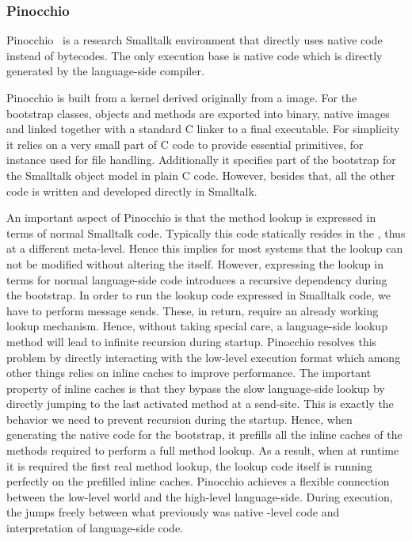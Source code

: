 \subsubsection*{Pinocchio \VM}

Pinocchio~\cite{Verw11a} is a research Smalltalk environment that directly uses native code instead of bytecodes.
The only execution base is native code which is directly generated by the language-side compiler.

Pinocchio is built from a kernel derived originally from a \PH image.
For the bootstrap classes, objects and methods are exported into binary, native images and linked together with a standard C linker to a final executable.
For simplicity it relies on a very small part of C code to provide essential primitives, for instance used for file handling.
Additionally it specifies part of the bootstrap for the Smalltalk object model in plain C code.
However, besides that, all the other code is written and developed directly in Smalltalk.

An important aspect of Pinocchio is that the method lookup is expressed in terms of normal Smalltalk code.
Typically this code statically resides in the \VM, thus at a different meta-level.
Hence this implies for most systems that the lookup can not be modified without altering the \VM itself.
However, expressing the lookup in terms for normal language-side code introduces a recursive dependency during the bootstrap.
In order to run the lookup code expressed in Smalltalk code, we have to perform message sends.
These, in return, require an already working lookup mechanism.
Hence, without taking special care, a language-side lookup method will lead to infinite recursion during startup.
Pinocchio resolves this problem by directly interacting with the low-level execution format which among other things relies on inline caches to improve performance.
The important property of inline caches is that they bypass the slow language-side lookup by directly jumping to the last activated method at a send-site.
This is exactly the behavior we need to prevent recursion during the startup.
Hence, when generating the native code for the bootstrap, it prefills all the inline caches of the methods required to perform a full method lookup.
As a result, when at runtime it is required the first real method lookup, the lookup code itself is running perfectly on the prefilled inline caches.
Pinocchio achieves a flexible connection between the low-level world and the high-level language-side.
During execution, the \VM jumps freely between what previously was native \VM-level code and interpretation of language-side code.

